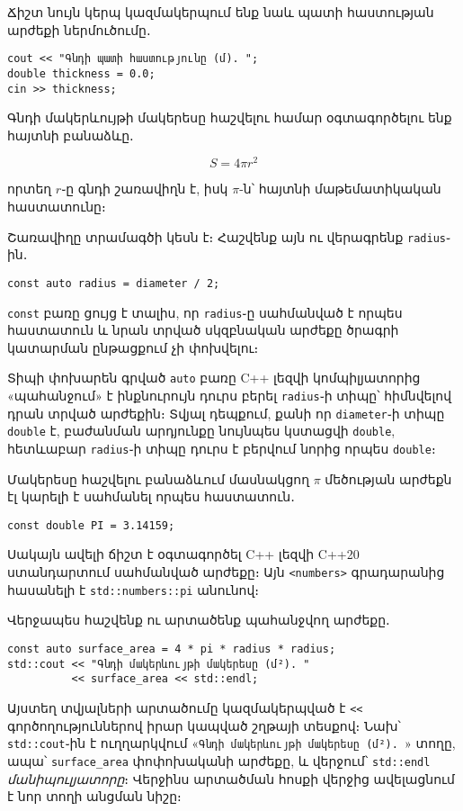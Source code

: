 Ճիշտ նույն կերպ կազմակերպում ենք նաև պատի հաստության արժեքի ներմուծումը․

\begin{Verbatim}
cout << "Գնդի պատի հաստությունը (մ). ";
double thickness = 0.0;
cin >> thickness;
\end{Verbatim}

Գնդի մակերևույթի մակերեսը հաշվելու համար օգտագործելու ենք հայտնի բանաձևը․

\[
S = 4\pi r^2
\]

\noindent որտեղ \(r\)֊ը գնդի շառավիղն է, իսկ \(\pi\)-ն՝ հայտնի 
մաթեմատիկական հաստատունը։

Շառավիղը տրամագծի կեսն է։ Հաշվենք այն ու վերագրենք \texttt{radius}֊ին․

\begin{Verbatim}
const auto radius = diameter / 2;
\end{Verbatim}

\texttt{const} բառը ցույց է տալիս, որ \texttt{radius}֊ը սահմանված է 
որպես հաստատուն և նրան տրված սկզբնական արժեքը ծրագրի կատարման ընթացքում 
չի փոխվելու։

Տիպի փոխարեն գրված \texttt{auto} բառը C++ լեզվի կոմպիլյատորից 
«պահանջում» է ինքնուրույն դուրս բերել \texttt{radius}֊ի տիպը՝ 
հիմնվելով դրան տրված արժեքին։ Տվյալ դեպքում, քանի որ 
\texttt{diameter}֊ի տիպը \texttt{double} է, բաժանման արդյունքը 
նույնպես կստացվի \texttt{double}, հետևաբար \texttt{radius}֊ի տիպը 
դուրս է բերվում նորից որպես \texttt{double}։ 

Մակերեսը հաշվելու բանաձևում մասնակցող \(\pi\) մեծության արժեքն էլ 
կարելի է սահմանել որպես հաստատուն․

\begin{Verbatim}
const double PI = 3.14159;
\end{Verbatim}

Սակայն ավելի ճիշտ է օգտագործել C++ լեզվի C++20 ստանդարտում սահմանված 
արժեքը։ Այն \texttt{<numbers>} գրադարանից հասանելի է 
\texttt{std::numbers::pi} անունով։

Վերջապես հաշվենք ու արտածենք պահանջվող արժեքը․

\begin{Verbatim}
const auto surface_area = 4 * pi * radius * radius;
std::cout << "Գնդի մակերևույթի մակերեսը (մ²). "
          << surface_area << std::endl;
\end{Verbatim}

Այստեղ տվյալների արտածումը կազմակերպված է \verb|<<| գործողություններով 
իրար կապված շղթայի տեսքով։ Նախ՝ \texttt{std::cout}֊ին է ուղղարկվում 
«\texttt{Գնդի մակերևույթի մակերեսը (մ²). }» տողը, ապա՝ 
\texttt{surface\_area} փոփոխականի արժեքը, և վերջում՝ \texttt{std::endl}
\emph{մանիպուլյատորը}։ Վերջինս արտածման հոսքի վերջից ավելացնում է նոր 
տողի անցման նիշը։

